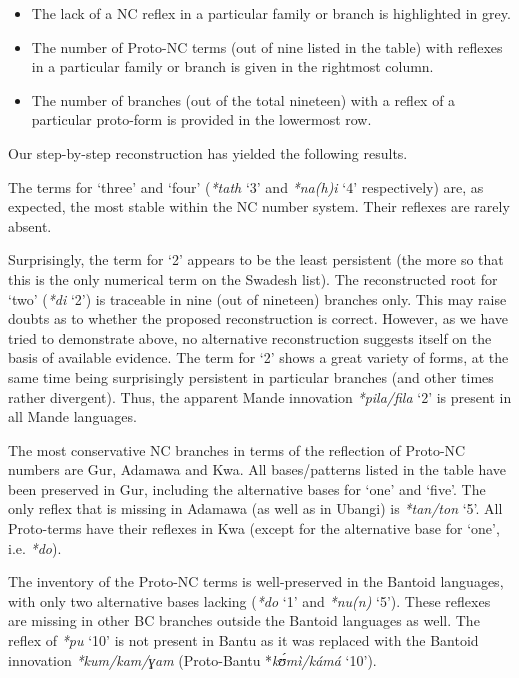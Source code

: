 \begin{itemize}
\item  The lack of a NC reflex in a particular family or branch is highlighted in grey.
\item  The number of Proto-NC terms (out of nine listed in the table) with reflexes in a particular family or branch is given in the rightmost column.
\item  The number of branches (out of the total nineteen) with a reflex of a particular proto-form is provided in the lowermost row.
\end{itemize}
Our step-by-step reconstruction has yielded the following results.

The terms for ‘three’ and ‘four’ (\textit{*tath} ‘3’ and \textit{*na}\textit{(h}\textit{)i} ‘4’ respectively) are, as expected, the most stable within the NC number system. Their reflexes are rarely absent.

Surprisingly, the term for ‘2’ appears to be the least persistent (the more so that this is the only numerical term on the Swadesh list). The reconstructed root for ‘two’ (\textit{*di} ‘2’) is traceable in nine (out of nineteen) branches only. This may raise doubts as to whether the proposed reconstruction is correct. However, as we have tried to demonstrate above, no alternative reconstruction suggests itself on the basis of available evidence. The term for ‘2’ shows a great variety of forms, at the same time being surprisingly persistent in particular branches (and other times rather divergent). Thus, the apparent Mande innovation \textit{*pila}\textit{/fila} ‘2’ is present in all Mande languages.

The most conservative NC branches in terms of the reflection of Proto-NC numbers are Gur, Adamawa and Kwa. All bases/patterns listed in the table have been preserved in Gur, including the alternative bases for ‘one’ and ‘five’. The only reflex that is missing in Adamawa (as well as in Ubangi) is \textit{*tan/ton} ‘5’. All Proto-terms have their reflexes in Kwa (except for the alternative base for ‘one’, i.e. \textit{*do}).

The inventory of the Proto-NC terms is well-preserved in the Bantoid languages, with only two alternative bases lacking (\textit{*do} ‘1’ and  \textit{*nu(n)} ‘5’). These reflexes are missing in other BC branches outside the Bantoid languages as well. The reflex of \textit{*pu} ‘10’ is not present in Bantu as it was replaced with the Bantoid innovation \textit{*kum/kam/ɣam} (Proto-Bantu *\textit{k{\'{ʊ}}mì/kámá} ‘10’).

